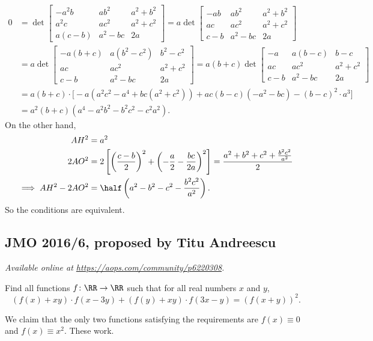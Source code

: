 \documentclass[11pt]{scrartcl}
\begin{document}
\begin{align*}
  0
  &= \det
  \begin{bmatrix}
    -a^2b & ab^2 & a^2+b^2 \\
    a^2c & ac^2 & a^2+c^2 \\
    a(c-b) & a^2-bc & 2a
  \end{bmatrix}
  = a \det
  \begin{bmatrix}
    -ab & ab^2 & a^2+b^2 \\
    ac & ac^2 & a^2+c^2 \\
    c-b & a^2-bc & 2a
  \end{bmatrix} \\
  &= a \det
  \begin{bmatrix}
    -a(b+c) & a(b^2-c^2) & b^2-c^2 \\
    ac & ac^2 & a^2+c^2 \\
    c-b & a^2-bc & 2a
  \end{bmatrix}
  = a(b+c) \det
  \begin{bmatrix}
    -a & a(b-c) & b-c \\
    ac & ac^2 & a^2+c^2 \\
    c-b & a^2-bc & 2a
  \end{bmatrix} \\
  &= a(b+c) \cdot \big[ -a(a^2c^2-a^4+bc(a^2+c^2))
  + ac(b-c) \left( -a^2-bc \right)
- (b-c)^2 \cdot a^3 \big] \\
  &= a^2(b+c)(a^4-a^2b^2-b^2c^2-c^2a^2).
\end{align*}
On the other hand,
\begin{align*}
  AH^2 &= a^2 \\
  2AO^2 &= 2 \left[ \left( \frac{c-b}{2} \right)^2
      + \left( - \frac{a}{2} - \frac{bc}{2a} \right)^2 \right]
  = \frac{a^2+b^2+c^2 + \frac{b^2c^2}{a^2}}{2} \\
  \implies AH^2 - 2AO^2 &= \half \left( a^2-b^2-c^2-\frac{b^2c^2}{a^2} \right).
\end{align*}
So the conditions are equivalent.
\pagebreak

\subsection{JMO 2016/6, proposed by Titu Andreescu}
\textsl{Available online at \url{https://aops.com/community/p6220308}.}
\begin{mdframed}[style=mdpurplebox,frametitle={Problem statement}]
Find all functions $f \colon \RR \to \RR$ such that
for all real numbers $x$ and $y$,
\[ (f(x)+xy) \cdot f(x-3y)
 + (f(y)+xy) \cdot f(3x-y)
 = (f(x+y))^2. \]
\end{mdframed}
We claim that the only two functions satisfying
the requirements are $f(x) \equiv 0$ and $f(x) \equiv x^2$.
These work.
\end{document}
